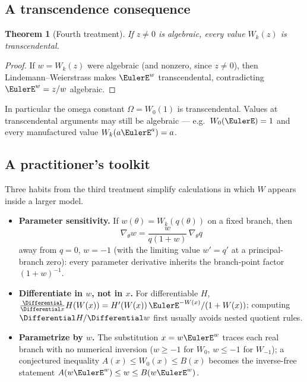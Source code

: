 \documentclass[11pt]{article}
\newtheorem{theorem}{Theorem}[section]
\theoremstyle{remark}
\begin{document}
\subsection{A transcendence consequence}

\begin{theorem}[Fourth treatment]\label{cmp:thm:transcendence}
If \(z\ne0\) is algebraic, every value \(W_k(z)\) is transcendental.
\end{theorem}

\begin{proof}
If \(w=W_k(z)\) were algebraic (and nonzero, since \(z\ne0\)), then
Lindemann--Weierstrass makes \(\EulerE^w\) transcendental, contradicting
\(\EulerE^w=z/w\) algebraic.
\end{proof}

In particular the omega constant \(\Omega=W_0(1)\) is transcendental.
Values at transcendental arguments may still be algebraic --- e.g.\
\(W_0(\EulerE)=1\) and every manufactured value \(W_k(a\EulerE^a)=a\).

\subsection{A practitioner's toolkit}

Three habits from the third treatment simplify calculations in which \(W\)
appears inside a larger model.

\begin{itemize}
\item\textbf{Parameter sensitivity.}  If
\(w(\theta)=W_k(q(\theta))\) on a fixed branch, then
\[
 \nabla_\theta w=\frac{w}{q(1+w)}\,\nabla_\theta q
\]
away from \(q=0\), \(w=-1\) (with the limiting value
\(w'=q'\) at a principal-branch zero): every parameter derivative inherits
the branch-point factor \((1+w)^{-1}\).
\item\textbf{Differentiate in \(w\), not in \(x\).}  For differentiable
\(H\),
\(\tfrac{\Differential}{\Differential x}H(W(x))=H'(W(x))\,\EulerE^{-W(x)}/(1+W(x))\); computing
\(\Differential H/\Differential w\) first usually avoids nested quotient rules.
\item\textbf{Parametrize by \(w\).}  The substitution \(x=w\EulerE^w\) traces
each real branch with no numerical inversion (\(w\ge-1\) for \(W_0\),
\(w\le-1\) for \(W_{-1}\)); a conjectured inequality
\(A(x)\le W_0(x)\le B(x)\) becomes the inverse-free statement
\(A(w\EulerE^w)\le w\le B(w\EulerE^w)\).
\end{itemize}
\end{document}
